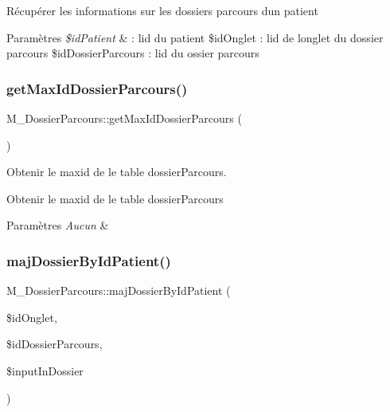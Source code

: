 Récupérer les informations sur les dossiers parcours d\textquotesingle{}un patient 
\begin{DoxyParams}{Paramètres}
{\em \$id\+Patient} & \+: l\textquotesingle{}id du patient \$id\+Onglet \+: l\textquotesingle{}id de l\textquotesingle{}onglet du dossier parcours \$id\+Dossier\+Parcours \+: l\textquotesingle{}id du ossier parcours \\
\hline
\end{DoxyParams}
\mbox{\label{class_m___dossier_parcours_a20bb0562e154f912dbfd30e703c22b73}} 
\subsubsection{\texorpdfstring{get\+Max\+Id\+Dossier\+Parcours()}{getMaxIdDossierParcours()}}
{\footnotesize\ttfamily M\+\_\+\+Dossier\+Parcours\+::get\+Max\+Id\+Dossier\+Parcours (\begin{DoxyParamCaption}{ }\end{DoxyParamCaption})}



Obtenir le maxid de le table dossier\+Parcours. 

Obtenir le maxid de le table dossier\+Parcours 
\begin{DoxyParams}{Paramètres}
{\em Aucun} & \\
\hline
\end{DoxyParams}
\mbox{\label{class_m___dossier_parcours_a519c29f2f464298c8376dd537af43300}} 
\subsubsection{\texorpdfstring{maj\+Dossier\+By\+Id\+Patient()}{majDossierByIdPatient()}}
{\footnotesize\ttfamily M\+\_\+\+Dossier\+Parcours\+::maj\+Dossier\+By\+Id\+Patient (\begin{DoxyParamCaption}\item[{}]{\$id\+Onglet,  }\item[{}]{\$id\+Dossier\+Parcours,  }\item[{}]{\$input\+In\+Dossier }\end{DoxyParamCaption})}



